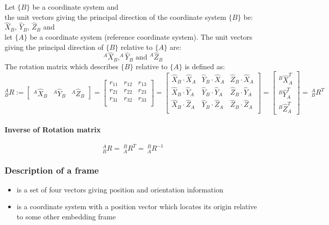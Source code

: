 \documentclass[10pt,a4paper]{article}
\newcommand{\vect}[1]{\ensuremath{\begin{bmatrix}#1\end{bmatrix}}}
\begin{document}
Let $\{B\}$ be a coordinate system and \\
the unit vectors giving the principal direction of the coordinate system $\{B\}$ be: $\hat{X}_B$, $\hat{Y}_B$, $\hat{Z}_B$ and \\
let $\{A\}$ be a coordinate system (reference coordinate system). The unit vectors giving the principal direction of $\{B\}$ relative to $\{A\}$ are: \\
\begin{equation*}
^A\hat{X}_B, ^A\hat{Y}_B \text{ and } ^A\hat{Z}_B
\end{equation*}
The rotation matrix which describes $\{B\}$ relative to $\{A\}$ is defined as:
\begin{equation*}
_B^AR := \vect{^A\hat{X}_B & ^A\hat{Y}_B & ^A\hat{Z}_B} = \begin{bmatrix}
r_{11} & r_{12} & r_{13} \\
r_{21} & r_{22} & r_{23} \\
r_{31} & r_{32} & r_{33} \\
\end{bmatrix} = \begin{bmatrix}
\hat{X}_B ⋅ \hat{X}_A & \hat{Y}_B ⋅ \hat{X}_A & \hat{Z}_B ⋅ \hat{X}_A \\
\hat{X}_B ⋅ \hat{Y}_A & \hat{Y}_B ⋅ \hat{Y}_A & \hat{Z}_B ⋅ \hat{Y}_A \\
\hat{X}_B ⋅ \hat{Z}_A & \hat{Y}_B ⋅ \hat{Z}_A & \hat{Z}_B ⋅ \hat{Z}_A \\
\end{bmatrix} = \vect{^B\hat{X}^T_A \\ ^B\hat{Y}^T_A \\ ^B\hat{Z}^T_A} = ~^A_BR^T
\end{equation*}

\paragraph{Inverse of Rotation matrix}
\begin{equation*}
^A_BR = ~^B_AR^T = ~^B_AR^{-1}
\end{equation*}

\subsubsection{Description of a frame}
\begin{itemize}
	\item is a set of four vectors giving position and orientation information
	\item is a coordinate system with a position vector which locates its origin relative to some other embedding frame
\end{itemize}
\end{document}
